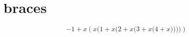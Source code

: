 \documentclass[a4paper,9pt]{scrartcl}
\begin{document}
\section{braces}
\[-1+x ( x \big( 1+ x\Big(2 + x \bigg(3+ x\Bigg(4+x \Bigg) \bigg) \Big) \big) ) \]
\end{document}
